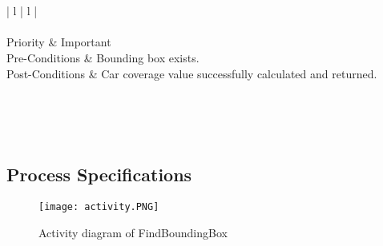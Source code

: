 \\
\\
\begin{tabular}{ | l | l | }
	\hline
  	 \\
  	\hline
  	\\
	\hline
	Priority & Important \\	
  	\hline
  	Pre-Conditions & Bounding box exists.\\
  	\hline
 	Post-Conditions & Car coverage  value successfully calculated and returned.\\
  	\hline
\end{tabular}\\
\\
\\
\pagebreak
\subsection{Process Specifications}
\begin{figure}[h!]
  \caption{Activity diagram of FindBoundingBox}
  \centering
	\texttt{[image: activity.PNG]}
\end{figure}
